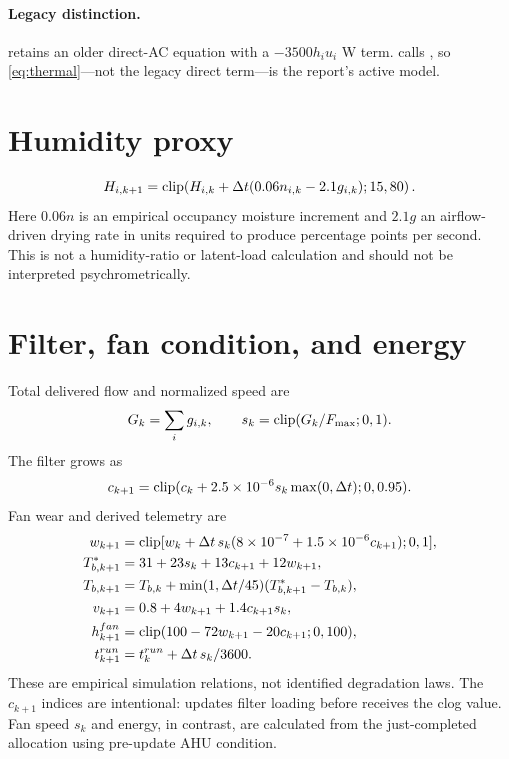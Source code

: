 \paragraph{Legacy distinction.}  retains an older direct-AC equation with a $-3500h_iu_i$ W term.  calls , so \cref{eq:thermal}---not the legacy direct term---is the report's active model.

\section{Humidity proxy}
\begin{equation}
H_{i,k+1}=\operatorname{clip}\!\left(H_{i,k}+\Delta t(0.06n_{i,k}-2.1g_{i,k});15,80\right).
\label{eq:humidity}
\end{equation}
Here $0.06n$ is an empirical occupancy moisture increment and $2.1g$ an airflow-driven drying rate in units required to produce percentage points per second. This is not a humidity-ratio or latent-load calculation and should not be interpreted psychrometrically.

\section{Filter, fan condition, and energy}
Total delivered flow and normalized speed are
\begin{equation}G_k=\sum_i g_{i,k},\qquad s_k=\operatorname{clip}(G_k/F_{\max};0,1).\end{equation}
The filter grows as
\begin{equation}c_{k+1}=\operatorname{clip}(c_k+2.5\times10^{-6}s_k\max(0,\Delta t);0,0.95).\end{equation}
Fan wear and derived telemetry are
\begin{align}
w_{k+1}&=\operatorname{clip}[w_k+\Delta t\,s_k(8\times10^{-7}+1.5\times10^{-6}c_{k+1});0,1],\\
T^*_{b,k+1}&=31+23s_k+13c_{k+1}+12w_{k+1},\\
T_{b,k+1}&=T_{b,k}+\min(1,\Delta t/45)(T^*_{b,k+1}-T_{b,k}),\\
v_{k+1}&=0.8+4w_{k+1}+1.4c_{k+1}s_k,\\
h^{fan}_{k+1}&=\operatorname{clip}(100-72w_{k+1}-20c_{k+1};0,100),\\
t^{run}_{k+1}&=t^{run}_k+\Delta t\,s_k/3600.
\end{align}
These are empirical simulation relations, not identified degradation laws. The $c_{k+1}$ indices are intentional:  updates filter loading before  receives the clog value. Fan speed $s_k$ and energy, in contrast, are calculated from the just-completed allocation using pre-update AHU condition.

